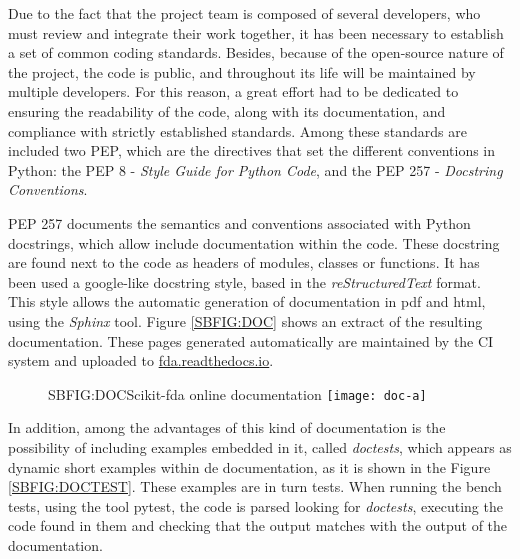 

Due to the fact that the project team is composed of several developers, who
must review and integrate their work together, it has been necessary to
establish a set of common coding standards.
Besides, because of the open-source nature of the project, the code is
public, and throughout its life will be maintained by multiple developers. For
this reason, a great effort had to be dedicated to ensuring the readability of
the code, along with its documentation, and compliance with strictly established
standards. Among these standards are included two \ac{PEP}, which are the directives that set the different conventions in Python:
the \ac{PEP} 8 - \textit{Style Guide for Python Code}, and the \acs{PEP} 257 - \textit{Docstring Conventions}.

\acs{PEP} 257 documents the semantics and conventions associated with Python
docstrings, which allow include documentation within the code. These docstring
are found next to the code as headers of modules, classes or functions. It has
been used a google-like docstring style, based in the \textit{reStructuredText} format.
This style allows the automatic generation of documentation in pdf and html,
using the \textit{Sphinx} tool. Figure \ref{SBFIG:DOC} shows an extract of the resulting documentation. These pages generated automatically are maintained by
the \ac{CI} system and uploaded to
\href{https://fda.readthedocs.io/}{fda.readthedocs.io}.

\begin{figure}[Scikit-fda online documentation]{SBFIG:DOC}{Scikit-fda online documentation}
	\texttt{[image: doc-a]}
\end{figure}

In addition, among the advantages of this kind of documentation is the
possibility of including examples embedded in it, called \textit{doctests}, which appears
 as dynamic short examples within de documentation, as it is shown in the
 Figure \ref{SBFIG:DOCTEST}.
These examples are in turn tests. When running the bench tests, using the tool
pytest, the code is parsed looking for \textit{doctests}, executing the code found in
them and checking that the output matches with the output of the documentation.

